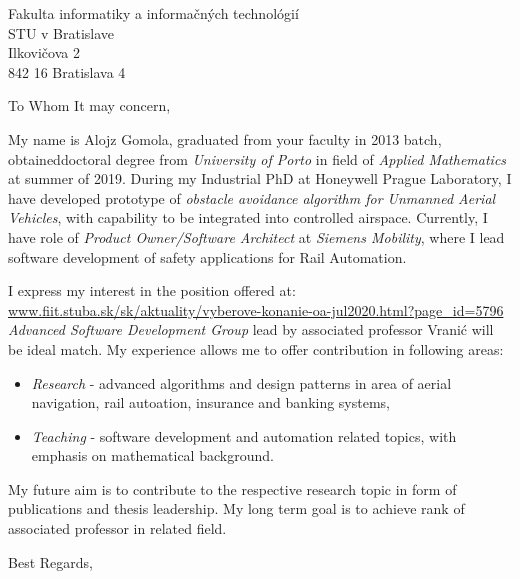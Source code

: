 \documentclass[a4paper,11pt,oneside,final,onecolumn,serif]{letter}
\begin{document}
\begin{letter}{Fakulta informatiky a informačných technológií\\ STU v Bratislave\\ Ilkovičova 2\\ 842 16 Bratislava 4}
\opening{To Whom It may concern,}
My name is Alojz Gomola, graduated from your faculty in 2013 batch, obtaineddoctoral degree from \emph{University of Porto} in field of \emph{Applied Mathematics} at summer of 2019. 
During my Industrial PhD at Honeywell Prague Laboratory, I have developed prototype of \emph{obstacle avoidance algorithm for Unmanned Aerial Vehicles}, with capability to be integrated into controlled airspace.
Currently, I have role of \emph{Product Owner/Software Architect} at \emph{Siemens Mobility}, where I lead software development of safety applications for Rail Automation.

I express my interest in the position offered at: \newline \url{www.fiit.stuba.sk/sk/aktuality/vyberove-konanie-oa-jul2020.html?page_id=5796}
\newline \newline \emph{Advanced Software Development Group} lead by associated professor Vranić will be ideal match. 
My experience allows me to offer contribution in following areas:
\begin{itemize}
	\item \emph{Research} - advanced algorithms and design patterns in area of aerial navigation, rail autoation, insurance and banking systems,
	\item \emph{Teaching} - software development and automation related topics, with emphasis on mathematical background.
\end{itemize}

My future aim is to contribute to the respective research topic in form of publications and thesis leadership. My long term goal is to achieve rank of associated professor in related field.
 
\closing{Best Regards,}
\end{letter}
\end{document}
